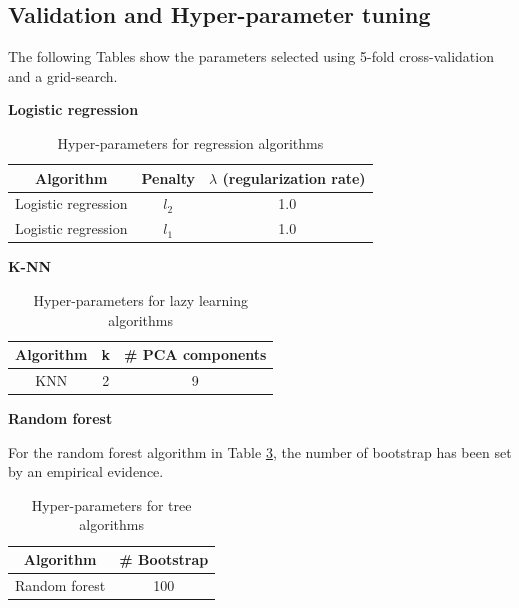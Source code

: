 \documentclass[10pt,conference,compsocconf]{IEEEtran}
\begin{document}
\subsection{Validation and Hyper-parameter tuning}

The following Tables show the parameters selected using 5-fold cross-validation and a grid-search.

\textbf{Logistic regression}

\begin{table}[H]
    \centering
    \begin{tabular}{|c|c|c|}
        \hline
        \textbf{Algorithm} &  \textbf{Penalty} &  $\lambda$ \textbf{(regularization rate)}\\\hline
        Logistic regression&$l_{2}$    & 1.0  \\\hline
                Logistic regression&$l_{1}$    & 1.0  \\\hline
    \end{tabular}
    \caption{Hyper-parameters for regression algorithms}
    \label{tab:param_regression}
\end{table}
\vspace{-1.2cm}

\textbf{K-NN}

\begin{table}[H]
    \centering
    \begin{tabular}{|c|c|c|}
        \hline
        \textbf{Algorithm} &\textbf{k} & \textbf{\# PCA components}\\\hline
        KNN& 2 & 9   \\\hline
    \end{tabular}
    \caption{Hyper-parameters for lazy learning algorithms}
    \label{tab:param_lazy}
\end{table}
\vspace{-0.5cm}

\textbf{Random forest}

For the random forest algorithm in Table \ref{tab:param_tree}, the number of bootstrap has been set by an empirical evidence.

\begin{table}[H]
    \centering
    \begin{tabular}{|c|c|}
        \hline
        \textbf{Algorithm} &\textbf{\# Bootstrap}\\\hline
        Random forest& 100 \\\hline
    \end{tabular}
    \caption{Hyper-parameters for tree algorithms}
    \label{tab:param_tree}
\end{table}
\vspace{-0.5cm}
\end{document}
